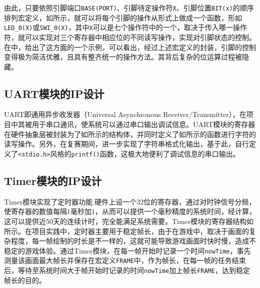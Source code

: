 由此，只要依照引脚端口\texttt{BASE(PORT)}、引脚待定操作符\texttt{X}、引脚位置\texttt{BIT(x)}的顺序排列宏定义，如所示，就可以将每个引脚的操作从形式上做成一个函数，形如\texttt{LED\_0(X)}或\texttt{SWI\_0(X)}，其中\texttt{X}可以是七个操作符中的一个，取决于传入哪一操作符，就可以实现对三个寄存器中相应位的不同读写操作，实现对引脚状态的控制。在中，给出了这方面的一个示例，可以看出，经过上述宏定义的封装，引脚的控制变得极为简洁优雅，且具有整齐统一的操作方法。其背后复杂的位运算过程被隐藏。



\subsection{UART模块的IP设计}
UART即通用异步收发器（Universal Asynchronous Receiver/Transmitter），在项目中其被用于串口通讯，使系统可以通过串口输出调试信息。UART模块的寄存器在硬件抽象层被封装为了如所示的结构体，并同时定义了如所示的函数进行字符的读写操作。另外，在复赛期间，进一步实现了字符串格式化输出，基于此，自行定义了\texttt{<stdio.h>}风格的\texttt{printf()}函数，这极大地便利了调试信息的串口输出。





\subsection{Timer模块的IP设计}
Timer模块实现了定时器功能.硬件上设一个32位的寄存器，通过对时钟信号分频，使寄存器的数值每隔$1$毫秒加$1$，从而可以提供一个毫秒精度的系统时间，经计算，这可以提供近50天的连续计时，完全能满足系统需要。Timer模块的寄存器结构如所示。在项目实践中，定时器主要用于稳定帧长，由于在游戏中，取决于画面的复杂程度，每一帧绘制的时长是不一样的，这就可能导致游戏画面时快时慢，造成不稳定的游戏体验。通过Timer模块，在每一帧开始时记录一个时间\texttt{nowTime}，事先测量该画面最大帧长并保存在宏定义\texttt{FRAME}中，作为帧长，在每一帧的任务结束后，等待至系统时间大于帧开始时记录的时间\texttt{nowTime}加上帧长\texttt{FRAME}，达到稳定帧长的目的。

